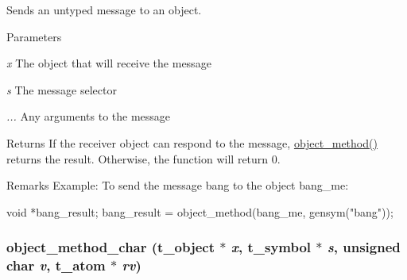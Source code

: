 Sends an untyped message to an object. 
\begin{DoxyParams}{Parameters}
\item[{\em x}]The object that will receive the message \item[{\em s}]The message selector \item[{\em ...}]Any arguments to the message\end{DoxyParams}
\begin{DoxyReturn}{Returns}
If the receiver object can respond to the message, \hyperlink{group__obj_gae740749094827ac5adc2b7145db1c596}{object\_\-method()} returns the result. Otherwise, the function will return 0.
\end{DoxyReturn}
\begin{DoxyRemark}{Remarks}
Example: To send the message {\ttfamily bang} to the object {\ttfamily bang\_\-me}: 
\begin{DoxyCode}
    void *bang_result;
    bang_result = object_method(bang_me, gensym("bang"));
\end{DoxyCode}
 
\end{DoxyRemark}
\hypertarget{group__obj_ga046f517695486f4008ae9b25ce5e41d7}{
\subsubsection[{object\_\-method\_\-char}]{ object\_\-method\_\-char ({\bf t\_\-object} $\ast$ {\em x}, \/  {\bf t\_\-symbol} $\ast$ {\em s}, \/  unsigned char {\em v}, \/  {\bf t\_\-atom} $\ast$ {\em rv})}}
\label{group__obj_ga046f517695486f4008ae9b25ce5e41d7}


